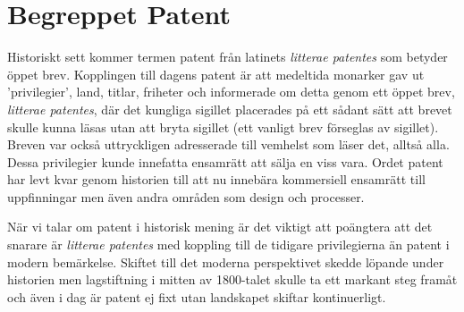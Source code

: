 \section{Begreppet Patent} %
\label{sec:lit}

Historiskt sett kommer termen patent från latinets \emph{litterae patentes} som
betyder öppet brev. Kopplingen till dagens patent är att medeltida monarker gav
ut 'privilegier', land, titlar, friheter och informerade om detta genom ett
öppet brev, \emph{litterae patentes}, där det kungliga sigillet placerades på
ett sådant sätt att brevet skulle kunna läsas utan att bryta sigillet\cite{blackstone} (ett vanligt brev förseglas av sigillet). Breven var också uttryckligen adresserade till 
vemhelst som läser det, alltså alla. Dessa privilegier kunde innefatta ensamrätt
att sälja en viss vara. Ordet patent har levt kvar genom historien till 
att nu innebära kommersiell ensamrätt till uppfinningar men även andra områden som design och processer. 

När vi talar om patent i historisk mening är det viktigt att poängtera att det 
snarare är \emph{litterae patentes} med koppling till de tidigare 
privilegierna än patent i modern bemärkelse. Skiftet till det moderna perspektivet skedde löpande under historien men lagstiftning i mitten av 1800-talet skulle ta ett markant steg framåt och även i dag är patent ej fixt utan landskapet skiftar kontinuerligt.
